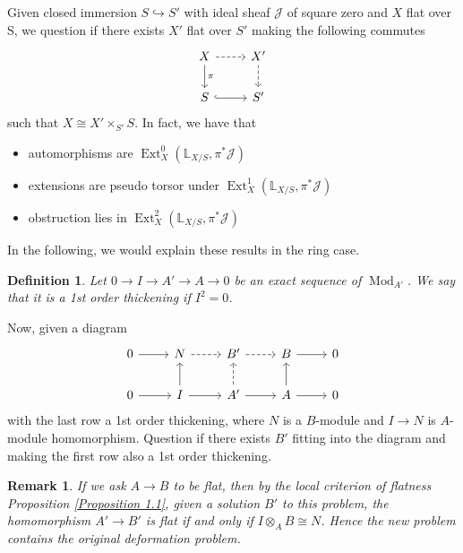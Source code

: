 \documentclass{ctexart}
\newtheorem{definition}{Definition}[section]
\newtheorem{remark}{Remark}[section]
\newcommand{\ext}{\operatorname{Ext}}
\newcommand{\module}{\operatorname{Mod}}
\begin{document}
Given closed immersion $S \hookrightarrow S'$ with ideal sheaf $\mathcal{J}$ of square zero and $X$ flat over S,
we question if there exists $X'$ flat over $S'$ making the following commutes
\begin{equation}
    \begin{tikzcd}
        X \arrow[r, dashrightarrow] \arrow[d, "\pi"] &
        X' \arrow[d, dashrightarrow] \\
        S \arrow[r, hookrightarrow] &
        S'
    \end{tikzcd}
\end{equation}
such that $X \cong X' \times_{S'} S$.
In fact, we have that
\begin{itemize}
    \item automorphisms are $\ext_{X}^{0}(\mathbb{L}_{X/S}, \pi^{\ast}\mathcal{J})$
    \item extensions are pseudo torsor under $\ext_{X}^{1}(\mathbb{L}_{X/S}, \pi^{\ast}\mathcal{J})$
    \item obstruction lies in $\ext_{X}^{2}(\mathbb{L}_{X/S}, \pi^{\ast}\mathcal{J})$
\end{itemize}
In the following, we would explain these results in the ring case.
\begin{definition}
    Let $0 \rightarrow I \rightarrow A' \rightarrow A \rightarrow 0$ be an exact sequence of $\module_{A'}$.
    We say that it is a 1st order thickening if $I^{2} = 0$. 
\end{definition}
Now, given a diagram
\begin{equation}
    \begin{tikzcd}
        0 \arrow[r] &
        N \arrow[r, dashrightarrow] &
        B' \arrow[r, dashrightarrow] &
        B \arrow[r] &
        0 \\
        0 \arrow[r] &
        I \arrow[u] \arrow[r] &
        A' \arrow[u, dashrightarrow] \arrow[r] &
        A \arrow[u] \arrow[r] &
        0
    \end{tikzcd}
    \label{equation:deformation_problem_of_1st_order_thickening}
\end{equation}
with the last row a 1st order thickening,
where $N$ is a $B$-module and $I \rightarrow N$ is $A$-module homomorphism.
Question if there exists $B'$ fitting into the diagram and making the first row also a 1st order thickening.
\begin{remark}
    If we ask $A \rightarrow B$ to be flat, then by the local criterion of flatness Proposition \ref{Proposition 1.1},
    given a solution $B'$ to this problem, the homomorphism $A' \rightarrow B'$ is flat if and only if $I \otimes_{A} B \cong N$.
    Hence the new problem contains the original deformation problem.
\end{remark}
\end{document}
